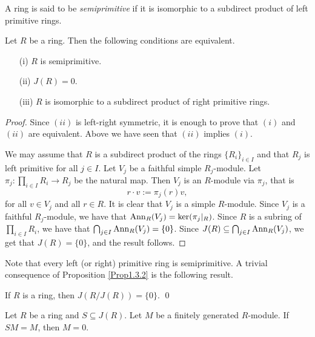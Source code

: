 \begin{definition}
A ring is said to be \emph{semiprimitive} if it is isomorphic to a subdirect product of left primitive rings.
\end{definition}

\begin{proposition}\label{Prop1.3.2}
Let $R$ be a ring. Then the following conditions are equivalent.
\begin{itemize}\item[(i)] $R$ is semiprimitive.
\item[(ii)] $J(R)=0$.
\item[(iii)] $R$ is isomorphic to a subdirect product of right primitive rings.
\end{itemize}
\end{proposition}

\begin{proof}
Since $(ii)$ is left-right symmetric, it is enough to prove that  $(i)$ and
$(ii)$ are equivalent. Above we have seen that $(ii)$ implies $(i)$. 

We may assume that $R$ is a subdirect product of the rings $\{ R_i\} _{i\in I}$
and that $R_j$ is left primitive for all $j\in I$. Let $V_j$ be a faithful simple $R_j$-module. 
Let $\pi _j\colon\prod_{i\in I}R_i\rightarrow R_j$ be the natural map. Then $V_j$ is an $R$-module via $\pi _j$,
that is
$$r\cdot v:=\pi_j(r)v,$$
for all $v\in V_j$ and all $r\in R$.
It is clear that $V_j$ is a simple $R$-module. Since $V_j$ is a faithful $R_j$-module, we have that
$\operatorname{Ann}_R(V_j)=\ker(\pi_j |_R)$. Since $R$ is a subring of $\prod_{i\in I}R_i$, we have that $\bigcap_{j\in I}\operatorname{Ann}_R(V_j)=\{0\}$.
Since $J(R)\subseteq \bigcap_{j\in I}\operatorname{Ann}_R(V_j)$, we get that $J(R)=\{0\}$, and the result follows.
\end{proof}

Note that every left (or right) primitive ring is semiprimitive. A trivial 
consequence of Proposition \ref{Prop1.3.2} is the following result.

\begin{corollary}\label{Cor1.3.3}
    If $R$ is a ring, then $J(R/J(R))=\{0\}$. \qed
\end{corollary}


\begin{proposition}
Let $R$ be a ring and $S\subseteq J(R)$. Let $M$ be a finitely generated $R$-module. If $SM=M$, then $M=0$.
\end{proposition}

